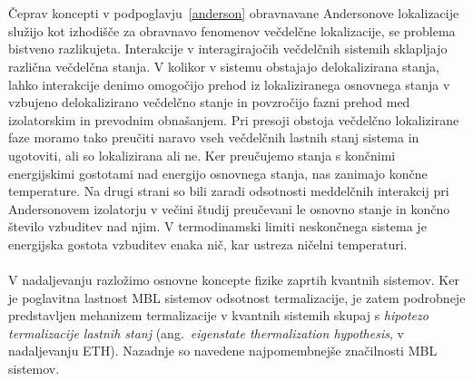 \\\\ 
Čeprav koncepti v podpoglavju~\ref{anderson} obravnavane Andersonove lokalizacije služijo kot izhodišče za obravnavo fenomenov večdelčne lokalizacije, se problema bistveno razlikujeta. Interakcije v interagirajočih večdelčnih sistemih sklapljajo različna večdelčna stanja. V kolikor v sistemu obstajajo delokalizirana stanja, lahko interakcije denimo omogočijo prehod iz lokaliziranega osnovnega stanja v vzbujeno delokalizirano večdelčno stanje in povzročijo fazni prehod med izolatorskim in prevodnim obnašanjem. Pri presoji obstoja večdelčno lokalizirane faze moramo tako preučiti naravo vseh večdelčnih lastnih stanj sistema in ugotoviti, ali so lokalizirana ali ne. Ker preučujemo stanja s končnimi energijskimi gostotami nad energijo osnovnega stanja, nas zanimajo končne temperature. Na drugi strani so bili zaradi odsotnosti meddelčnih interakcij pri Andersonovem izolatorju v večini študij preučevani le osnovno stanje in končno število vzbuditev nad njim. V termodinamski limiti neskončnega sistema je energijska gostota vzbuditev enaka nič, kar ustreza ničelni temperaturi. 
\\\\
V nadaljevanju razložimo osnovne koncepte fizike zaprtih kvantnih sistemov. Ker je poglavitna lastnost MBL sistemov odsotnost termalizacije, je zatem podrobneje predstavljen mehanizem termalizacije v kvantnih sistemih skupaj s \emph{hipotezo termalizacije lastnih stanj} (ang.~\emph{eigenstate thermalization hypothesis}, v nadaljevanju ETH). Nazadnje so navedene najpomembnejše značilnosti MBL sistemov. 
